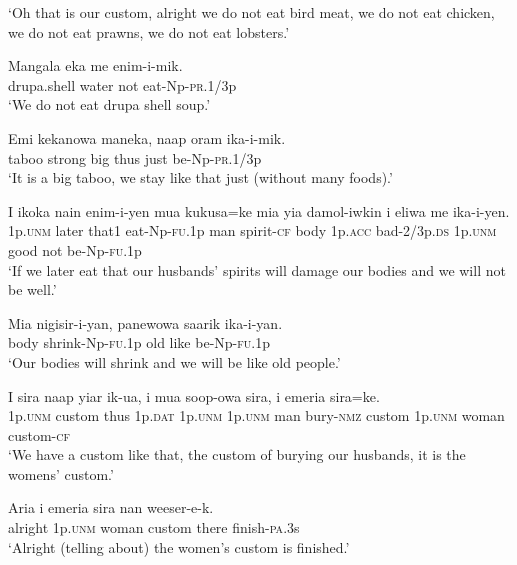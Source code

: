 \glt ‘Oh that is our custom, alright we do not eat bird meat, we do not eat chicken, we do not eat prawns, we do not eat lobsters.’ \\
\z


\ea
\gll  Mangala  eka  me  enim-i-mik. \\
drupa.shell  water  not  eat-Np-\textsc{pr}.1/3p \\
\glt ‘We do not eat drupa shell soup.’ \\
\z


\ea
\gll  Emi  kekanowa  maneka,  naap  oram  ika-i-mik. \\
taboo  strong  big  thus  just  be-Np-\textsc{pr}.1/3p \\
\glt ‘It is a big taboo, we stay like that just (without many foods).’ \\
\z


\ea
\gll  I  ikoka  nain  enim-i-yen  mua  kukusa=ke  mia  yia       damol-iwkin  i  eliwa  me  ika-i-yen. \\
1p.\textsc{unm}  later  that1  eat-Np-\textsc{fu}.1p  man  spirit-\textsc{cf}  body  1p.\textsc{acc} bad-2/3p.\textsc{ds}  1p.\textsc{unm}  good  not  be-Np-\textsc{fu}.1p \\


\glt ‘If we later eat that our husbands’ spirits will damage our bodies and we will not be well.’ \\
\z


\ea
\gll  Mia  nigisir-i-yan,  panewowa  saarik  ika-i-yan. \\
body  shrink-Np-\textsc{fu}.1p  old  like  be-Np-\textsc{fu}.1p \\
\glt ‘Our bodies will shrink and we will be like old people.’ \\
\z


\ea
\gll  I  sira  naap  yiar  ik-ua,  i  mua  soop-owa  sira,          i  emeria  sira=ke. \\
1p.\textsc{unm}  custom  thus  1p.\textsc{dat}  1p.\textsc{unm}  1p.\textsc{unm}  man  bury-\textsc{nmz}  custom 1p.\textsc{unm}  woman  custom-\textsc{cf} \\


\glt ‘We have a custom like that, the custom of burying our husbands, it is the womens’ custom.’ \\
\z


\ea
\gll  Aria  i  emeria  sira  nan  weeser-e-k. \\
alright  1p.\textsc{unm}  woman  custom  there  finish-\textsc{pa}.3s \\
\glt ‘Alright (telling about) the women’s custom is finished.’ \\
\z


